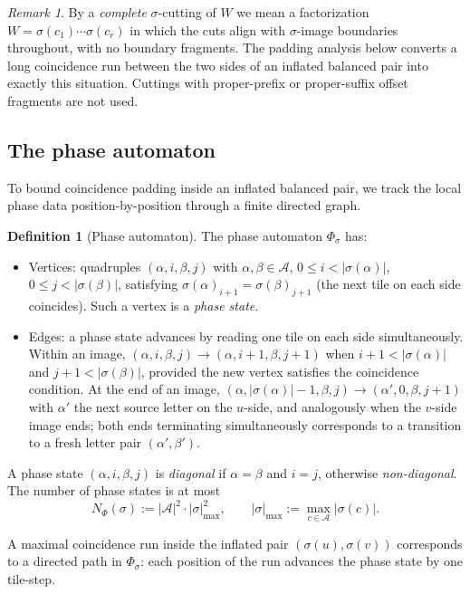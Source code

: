 \documentclass[11pt]{article}
\theoremstyle{plain}
\theoremstyle{definition}
\newtheorem{definition}[theorem]{Definition}
\theoremstyle{remark}
\newtheorem{remark}[theorem]{Remark}
\newcommand{\A}{\mathcal{A}}
\begin{document}
\begin{remark}\label{rem:complete-cutting}
By a \emph{complete} $\sigma$-cutting of $W$ we mean a factorization $W=\sigma(c_1)\cdots\sigma(c_r)$ in which the cuts align with $\sigma$-image boundaries throughout, with no boundary fragments. The padding analysis below converts a long coincidence run between the two sides of an inflated balanced pair into exactly this situation. Cuttings with proper-prefix or proper-suffix offset fragments are not used.
\end{remark}

\subsection{The phase automaton}

To bound coincidence padding inside an inflated balanced pair, we track the local phase data position-by-position through a finite directed graph.

\begin{definition}[Phase automaton]\label{def:phase}
The phase automaton $\Phi_\sigma$ has:
\begin{itemize}[leftmargin=*]
\item Vertices: quadruples $(\alpha,i,\beta,j)$ with $\alpha,\beta\in\A$, $0\le i<|\sigma(\alpha)|$, $0\le j<|\sigma(\beta)|$, satisfying $\sigma(\alpha)_{i+1}=\sigma(\beta)_{j+1}$ (the next tile on each side coincides). Such a vertex is a \emph{phase state}.
\item Edges: a phase state advances by reading one tile on each side simultaneously. Within an image, $(\alpha,i,\beta,j)\to(\alpha,i+1,\beta,j+1)$ when $i+1<|\sigma(\alpha)|$ and $j+1<|\sigma(\beta)|$, provided the new vertex satisfies the coincidence condition. At the end of an image, $(\alpha,|\sigma(\alpha)|-1,\beta,j)\to(\alpha',0,\beta,j+1)$ with $\alpha'$ the next source letter on the $u$-side, and analogously when the $v$-side image ends; both ends terminating simultaneously corresponds to a transition to a fresh letter pair $(\alpha',\beta')$.
\end{itemize}
A phase state $(\alpha,i,\beta,j)$ is \emph{diagonal} if $\alpha=\beta$ and $i=j$, otherwise \emph{non-diagonal}. The number of phase states is at most
\[
N_\Phi(\sigma) := |\A|^2\cdot|\sigma|_{\max}^2,\qquad |\sigma|_{\max}:=\max_{c\in\A}|\sigma(c)|.
\]
\end{definition}

A maximal coincidence run inside the inflated pair $(\sigma(u),\sigma(v))$ corresponds to a directed path in $\Phi_\sigma$: each position of the run advances the phase state by one tile-step.
\end{document}

